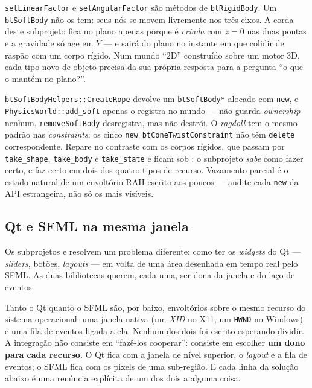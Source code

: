 \begin{armadilha}
\texttt{setLinearFactor} e \texttt{setAngularFactor} são métodos de
\texttt{btRigidBody}. Um \texttt{btSoftBody} não os tem: seus nós se movem
livremente nos três eixos. A corda deste subprojeto fica no plano apenas porque
é \emph{criada} com $z = 0$ nas duas pontas e a gravidade só age em $Y$ --- e
sairá do plano no instante em que colidir de raspão com um corpo rígido. Num
mundo ``2D'' construído sobre um motor 3D, cada tipo novo de objeto precisa da
sua própria resposta para a pergunta ``o que o mantém no plano?''.
\end{armadilha}

\begin{armadilha}
\texttt{btSoftBodyHelpers::CreateRope} devolve um \texttt{btSoftBody*} alocado
com \texttt{new}, e \texttt{PhysicsWorld::add\_soft} apenas o registra no mundo
--- não guarda \emph{ownership} nenhum. \texttt{removeSoftBody} desregistra, mas
não destrói. O \emph{ragdoll} tem o mesmo padrão nas \emph{constraints}: os cinco
\texttt{new btConeTwistConstraint} não têm \texttt{delete} correspondente. Repare
no contraste com os corpos rígidos, que passam por \texttt{take\_shape},
\texttt{take\_body} e \texttt{take\_state} e ficam sob :
o subprojeto \emph{sabe} como fazer certo, e faz certo em dois dos quatro tipos
de recurso. Vazamento parcial é o estado natural de um envoltório RAII escrito
aos poucos --- audite cada \texttt{new} da API estrangeira, não só os mais
visíveis.
\end{armadilha}

\subsection{Qt e SFML na mesma janela}
\label{sec:qt-sfml}

Os subprojetos  e  resolvem um problema
diferente: como ter os \emph{widgets} do Qt --- \emph{sliders}, botões,
\emph{layouts} --- em volta de uma área desenhada em tempo real pelo SFML. As
duas bibliotecas querem, cada uma, ser dona da janela e do laço de eventos.

\begin{porque}
Tanto o Qt quanto o SFML são, por baixo, envoltórios sobre o mesmo recurso do
sistema operacional: uma janela nativa (um \emph{XID} no X11, um \texttt{HWND} no
Windows) e uma fila de eventos ligada a ela. Nenhum dos dois foi escrito
esperando dividir. A integração não consiste em ``fazê-los cooperar'': consiste
em escolher \textbf{um dono para cada recurso}. O Qt fica com a janela de nível
superior, o \emph{layout} e a fila de eventos; o SFML fica com os pixels de uma
sub-região. E cada linha da solução abaixo é uma renúncia explícita de um dos
dois a alguma coisa.
\end{porque}

